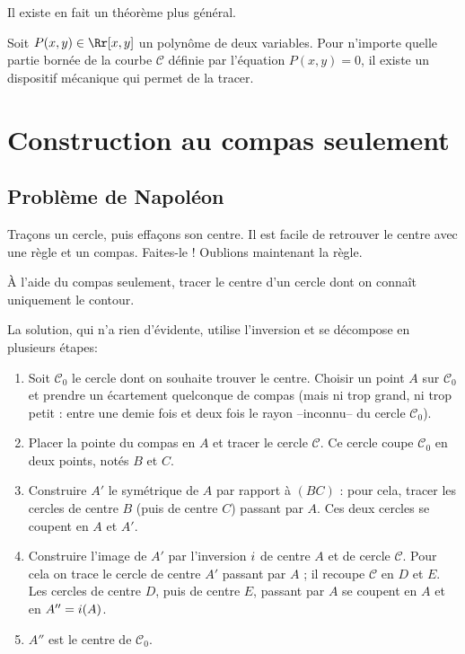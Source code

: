 \documentclass[11pt,class=report,crop=false]{standalone}
\begin{document}
Il existe en fait un théorème plus général.
\begin{theoreme}
Soit $P(x,y) \in \Rr[x,y]$ un polynôme de deux variables.
Pour n'importe quelle partie bornée de la courbe $\mathcal{C}$ définie par l'équation $P(x,y)=0$, 
il existe un dispositif 
mécanique qui permet de la tracer.
\end{theoreme}


\section{Construction au compas seulement}

\subsection{Problème de Napoléon}

Traçons un cercle, puis effaçons son centre. Il est facile de retrouver le centre avec une règle
et un compas. Faites-le ! Oublions maintenant la règle. 

  \`A l'aide du compas seulement, 
tracer le centre d'un cercle dont on connaît uniquement le contour.

La solution, qui n'a rien d'évidente, utilise l'inversion et se décompose en plusieurs étapes:
\begin{enumerate}
  \item Soit $\mathcal{C}_0$ le cercle dont on souhaite trouver le centre. Choisir un point $A$ sur
  $\mathcal{C}_0$ et prendre un écartement quelconque de compas (mais ni trop grand, ni trop petit :
  entre une demie fois et deux fois le rayon --inconnu-- du cercle $\mathcal{C}_0$).

 
  \item Placer la pointe du compas en $A$ et tracer le cercle $\mathcal{C}$. Ce cercle coupe $\mathcal{C}_0$ en deux points, notés
  $B$ et $C$.
 
  \item Construire $A'$ le symétrique de $A$ par rapport à $(BC)$ : pour cela, tracer
  les cercles de centre $B$ (puis de centre $C$) passant par $A$. Ces deux cercles se coupent en $A$ et $A'$.
  
  \item Construire l'image de $A'$ par l'inversion $i$ de centre $A$ et de cercle $\mathcal{C}$.
  Pour cela on trace le cercle de centre $A'$ passant par $A$ ; il recoupe $\mathcal{C}$ en $D$ et $E$.
  Les cercles de centre $D$, puis de centre $E$, passant par $A$ se coupent en $A$ et en $A''=i(A)$.
  
  
  \item $A''$ est le centre de $\mathcal{C}_0$. 
\end{enumerate}
\end{document}
